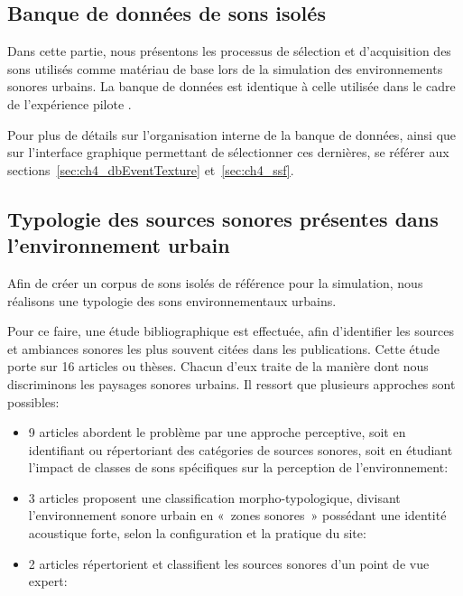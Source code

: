 \subsection{Banque de données de sons isolés}

Dans cette partie, nous présentons les processus de sélection et d'acquisition des sons utilisés comme matériau de base lors de la simulation des environnements sonores urbains. La banque de données est identique à celle utilisée dans le cadre de l'expérience pilote \citep{lafay2013atiam,lafay2014new}. 

Pour plus de détails sur l'organisation interne de la banque de données, ainsi que sur l'interface graphique permettant de sélectionner ces dernières, se référer aux sections~\ref{sec:ch4_dbEventTexture} et~\ref{sec:ch4_ssf}.

\subsection[Typologie des sources sonores]{Typologie des sources sonores présentes dans l'environnement urbain}

Afin de créer un corpus de sons isolés de référence pour la simulation, nous réalisons une typologie des sons environnementaux urbains. 

Pour ce faire, une étude bibliographique est effectuée, afin d'identifier les sources et ambiances sonores les plus souvent citées dans les publications. Cette étude porte sur 16 articles ou thèses. Chacun d'eux traite de la manière dont nous discriminons les paysages sonores urbains. Il ressort que plusieurs approches sont possibles:

\begin{itemize}
\item 9 articles abordent le problème par une approche perceptive, soit en identifiant ou répertoriant des catégories de sources sonores, soit en étudiant l'impact de classes de sons spécifiques sur la perception de l'environnement: \cite{maffiolo_caracterisation_1999,raimbault2002simulation,guastavino_etude_2003,defreville2004aactivity,raimbault2005urban,dubois2006cognitive,devergie_relations_2006,guastavino2006ideal,niessen2010categories}
\item 3 articles proposent une classification morpho-typologique, divisant l’environnement sonore urbain en «~zones sonores~» possédant une identité acoustique forte, selon la configuration et la pratique du site: \cite{maffiolo_caracterisation_1999,beaumont2004pertinence,polack2008perceptive}
\item 2 articles répertorient et classifient les sources sonores d’un point de vue expert: \cite{leobon_analyse_1986,brown2011towards}
\end{itemize}

